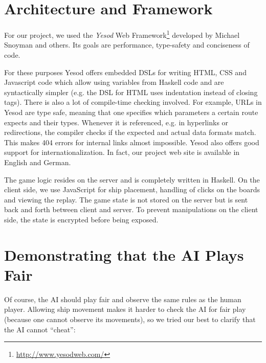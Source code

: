 \documentclass[a4paper]{easychair}
\begin{document}
\section{Architecture and Framework}

For our project, we used the \emph{Yesod} Web Framework\footnote{\url{http://www.yesodweb.com/}} developed by Michael Snoyman and others. Its goals are performance, type-safety and conciseness of code.

For these purposes Yesod offers embedded DSLs for writing HTML, CSS and Javascript code which allow using variables from Haskell code and are syntactically simpler (e.g. the DSL for HTML uses indentation instead of closing tags). There is also a lot of compile-time checking involved. For example, URLs in Yesod are type safe, meaning that one specifies which parameters a certain route expects and their types. Whenever it is referenced, e.g. in hyperlinks or redirections, the compiler checks if the expected and actual data formats match. This makes 404 errors for internal links almost impossible. Yesod also offers good support for internationalization. In fact, our project web site is available in English and German.

The game logic resides on the server and is completely written in Haskell. On the client side, we use JavaScript for ship placement, handling of clicks on the boards and viewing the replay. The game state is not stored on the server but is sent back and forth between client and server. To prevent manipulations on the client side, the state is encrypted before being exposed. %

\section{Demonstrating that the AI Plays Fair}
\label{sect:fair-play}
Of course, the AI should play fair and observe the same rules as the human player. Allowing ship movement makes it harder to check the AI for fair play (because one cannot observe its movements), so we tried our best to clarify that the AI cannot ``cheat'':
\end{document}
